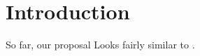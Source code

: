 \section{Introduction}
\label{sec:introduction}

So far, our proposal Looks fairly similar to \cite{Merrill:2007:ALP:1758156.1758158}.

